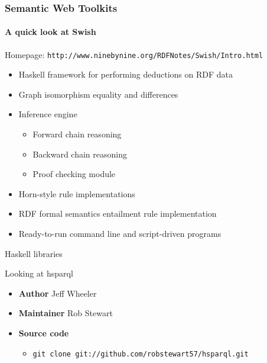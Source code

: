 \documentclass{beamer}
\begin{document}
\begin{frame}[fragile]
\frametitle{Semantic Web Toolkits}
\framesubtitle{A quick look at Swish}

Homepage: \texttt{http://www.ninebynine.org/RDFNotes/Swish/Intro.html}


\begin{itemize}

\item Haskell framework for performing deductions on RDF data
\item Graph isomorphism equality and differences
\item Inference engine
  
  \begin{itemize}
  \item Forward chain reasoning
  \item Backward chain reasoning
  \item Proof checking module
  \end{itemize}
  
\item Horn-style rule implementations
\item RDF formal semantics entailment rule implementation
\item Ready-to-run command line and script-driven programs
  
\end{itemize}


\end{frame}


\begin{frame}

\huge
\begin{center}
Haskell libraries
\end{center}

\large
\begin{center}
Looking at hsparql
\end{center}

\begin{itemize}
\item \textbf{Author} Jeff Wheeler
\item \textbf{Maintainer} Rob Stewart
\item \textbf{Source code}

\begin{itemize}
\item \texttt{git clone git://github.com/robstewart57/hsparql.git}
\end{itemize}

\end{itemize}

\end{frame}
\end{document}
